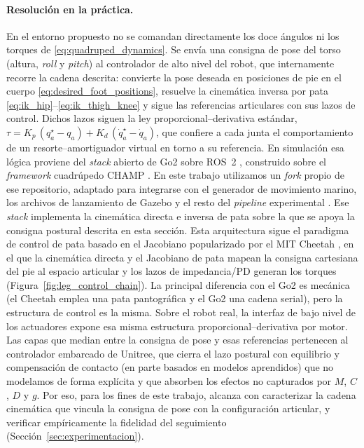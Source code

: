 \documentclass[12pt,a4paper]{report}
\begin{document}
\paragraph{Resolución en la práctica.}
En el entorno propuesto no se comandan directamente los doce ángulos ni los
torques de \eqref{eq:quadruped_dynamics}. Se envía una consigna de pose del torso
(altura, \emph{roll} y \emph{pitch}) al controlador de alto nivel del robot, que
internamente recorre la cadena descrita: convierte la pose deseada en posiciones
de pie en el cuerpo \eqref{eq:desired_foot_positions}, resuelve la cinemática
inversa por pata \eqref{eq:ik_hip}--\eqref{eq:ik_thigh_knee} y sigue las
referencias articulares con sus lazos de control. Dichos lazos siguen la ley
proporcional--derivativa estándar,
\(\tau = K_p\,(q_a^\star - q_a) + K_d\,(\dot q_a^\star - \dot q_a)\), que
confiere a cada junta el comportamiento de un resorte--amortiguador virtual en
torno a su referencia. En simulación esa lógica
proviene del \emph{stack} abierto de Go2 sobre {ROS}~2
\citep{UnitreeGo2ROS2}, construido sobre el \emph{framework} cuadrúpedo {CHAMP}
\citep{CHAMP}. En este trabajo utilizamos un \emph{fork} propio de ese
repositorio, adaptado para integrarse con el generador de movimiento marino, los
archivos de lanzamiento de Gazebo y el resto del \textit{pipeline} experimental
\citep{UnitreeGo2ROS2Fork}. Ese \emph{stack} implementa la cinemática directa e
inversa de pata sobre la que se apoya la consigna postural descrita en esta
sección. Esta arquitectura sigue el paradigma de control de pata basado
en el Jacobiano popularizado por el MIT Cheetah \citep{Lee2013Cheetah}, en el que
la cinemática directa y el Jacobiano de pata mapean la consigna cartesiana del pie
al espacio articular y los lazos de impedancia/PD generan los torques
(Figura~\ref{fig:leg_control_chain}). La principal diferencia con el Go2 es
mecánica (el Cheetah emplea una pata pantográfica y el Go2 una cadena serial),
pero la estructura de control es la misma. Sobre el robot real, la interfaz de
bajo nivel de los actuadores expone esa misma estructura
proporcional--derivativa por motor. Las capas que median entre la consigna de
pose y esas referencias pertenecen al controlador embarcado de Unitree, que
cierra el lazo postural con equilibrio y compensación de contacto (en parte
basados en modelos aprendidos) que no modelamos de forma explícita y que
absorben los efectos no capturados por \(M\), \(C\), \(D\) y \(g\). Por eso, para los fines de este trabajo, alcanza con
caracterizar la cadena cinemática que vincula la consigna de pose con la
configuración articular, y verificar empíricamente la fidelidad del seguimiento
(Sección~\ref{sec:experimentacion}).
\end{document}
